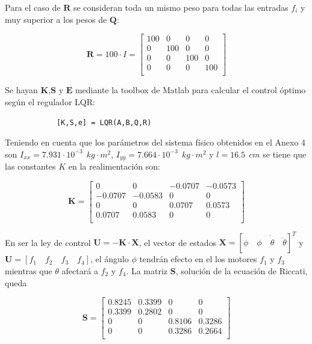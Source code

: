 \documentclass[twoside,11pt]{report}
\begin{document}
Para el caso de $\mathbf{R}$ se consideran toda un mismo peso para todas las entradas $f_i$ y muy superior a los pesos de $\mathbf{Q}$: 

\begin{equation}
\mathbf{R}=100 \cdot I = \left[ \begin{array}{cccc}
100 &   0 &   0 &   0 \\
0   & 100 &   0 &   0 \\
0   &   0 & 100 &   0 \\
0   &   0 &   0 & 100 \\ \end{array} \right] 
\end{equation}

Se hayan $\mathbf{K}$,$\mathbf{S}$ y $ \mathbf{E}$ mediante la toolbox de Matlab para calcular el control óptimo según el regulador LQR\cite{Toolbox_lqr}:

\begin{verbatim}
            [K,S,e] = LQR(A,B,Q,R)
\end{verbatim}

Teniendo en cuenta que los parámetros del sistema físico obtenidos en el Anexo 4 son $I_{xx}=7.931\cdot 10^{-3} \>\> kg \cdot m^{2}$, $I_{yy}=7.664\cdot 10^{-3}\>\> kg \cdot m^{2}$ y $l=16.5 \>\> cm$ se tiene que las constantes $K$ en la realimentación son:

\begin{equation}
\mathbf{K}= \left[ \begin{array}{cccc}
         0  &      0  &  -0.0707  & -0.0573 \\
   -0.0707 &   -0.0583    &     0    &     0 \\
         0    &     0 &   0.0707  &  0.0573 \\
    0.0707  &  0.0583    &     0    &     0 \\ \end{array} \right]
\end{equation}

En ser la ley de control $\pmb{U}=-\mathbf{K}\cdot \mathbf{X}$, el vector de estados $\mathbf{X}=[\phi \quad \dot{\phi \quad \theta \quad \dot{\theta}}]^{T}$ y $\mathbf{U}=[f_{1} \quad f_{2} \quad f_{3} \quad f_{4}]$, el ángulo $\phi$ tendrán efecto en el los motores $f_{1}$ y  $f_{3}$ mientras que $\theta$ afectará a $f_{2}$ y $f_{4}$. La matriz $\mathbf{S}$, solución de la ecuación de Riccati, queda

\begin{equation}
\mathbf{S}= \left[ \begin{array}{cccc}

    0.8245  &  0.3399    &     0 &        0 \\
    0.3399  &  0.2802     &    0   &      0 \\
         0  &       0  &  0.8106  &  0.3286 \\
         0   &      0  & 0.3286  &  0.2664 \\ \end{array}     \right]
\end{equation}
\end{document}
